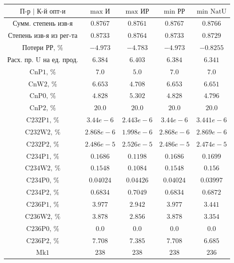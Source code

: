 \begin{table}
    \begin{tabular}{ccccc}
        $\text{П-р | К-й опт-и}$ & $\text{max И}$ & $\text{max ИР}$ & $\text{min РР}$ & $\text{min NatU}$\\ \hline
        $\text{Сумм. степень изв-я}$ & $0.8767$ & $0.8761$ & $0.8767$ & $0.8766$\\ \hline
        $\text{Степень изв-я из рег-та}$ & $0.8733$ & $0.8764$ & $0.8733$ & $0.8729$\\ \hline
        $\text{Потери РР, \%}$ & $-4.973$ & $-4.783$ & $-4.973$ & $-0.8255$\\ \hline
        $\text{Расх. пр. U на ед. прод.}$ & $6.384$ & $6.403$ & $6.384$ & $6.341$\\ \hline
        $\text{CnP1, \%}$ & $7.0$ & $5.0$ & $7.0$ & $7.0$\\ \hline
        $\text{CnW2, \%}$ & $6.653$ & $4.708$ & $6.653$ & $6.651$\\ \hline
        $\text{CnP0, \%}$ & $4.828$ & $5.302$ & $4.828$ & $4.796$\\ \hline
        $\text{CnP2, \%}$ & $20.0$ & $20.0$ & $20.0$ & $20.0$\\ \hline
        $\text{C232P1, \%}$ & $3.44e-6$ & $2.443e-6$ & $3.44e-6$ & $3.441e-6$\\ \hline
        $\text{C232W2, \%}$ & $2.868e-6$ & $1.998e-6$ & $2.868e-6$ & $2.869e-6$\\ \hline
        $\text{C232P2, \%}$ & $2.486e-5$ & $2.526e-5$ & $2.486e-5$ & $2.474e-5$\\ \hline
        $\text{C234P1, \%}$ & $0.1686$ & $0.1198$ & $0.1686$ & $0.1699$\\ \hline
        $\text{C234W2, \%}$ & $0.1548$ & $0.1084$ & $0.1548$ & $0.156$\\ \hline
        $\text{C234P0, \%}$ & $0.04024$ & $0.04426$ & $0.04024$ & $0.03997$\\ \hline
        $\text{C234P2, \%}$ & $0.6834$ & $0.7049$ & $0.6834$ & $0.6872$\\ \hline
        $\text{C236P1, \%}$ & $3.977$ & $2.942$ & $3.977$ & $3.441$\\ \hline
        $\text{C236W2, \%}$ & $3.878$ & $2.856$ & $3.878$ & $3.354$\\ \hline
        $\text{C236P0, \%}$ & $0.0$ & $0.0$ & $0.0$ & $0.0$\\ \hline
        $\text{C236P2, \%}$ & $7.708$ & $7.385$ & $7.708$ & $6.685$\\ \hline
        $\text{Mk1}$ & $238$ & $238$ & $238$ & $236$\\ \hline

\end{tabular}
\end{table}
